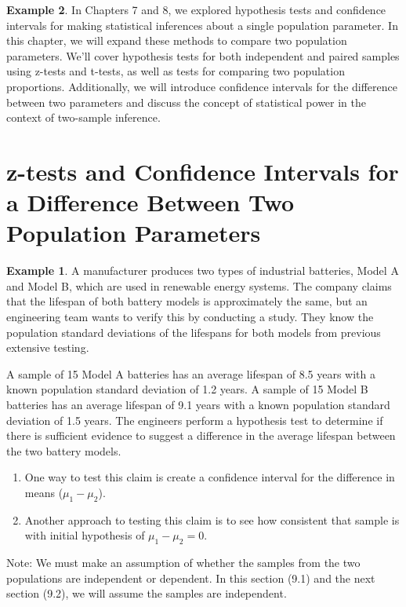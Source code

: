\documentclass[
  11pt,
  oneside]{book}
\providecommand{\tightlist}{%
  \setlength{\itemsep}{0pt}\setlength{\parskip}{0pt}}
\theoremstyle{definition}
\theoremstyle{definition}
\newtheorem{example}{Example}[chapter]
\theoremstyle{definition}
\theoremstyle{definition}
\theoremstyle{remark}
\begin{document}
\begin{example}
In Chapters 7 and 8, we explored hypothesis tests and confidence intervals for making statistical inferences about a single population parameter. In this chapter, we will expand these methods to compare two population parameters. We'll cover hypothesis tests for both independent and paired samples using z-tests and t-tests, as well as tests for comparing two population proportions. Additionally, we will introduce confidence intervals for the difference between two parameters and discuss the concept of statistical power in the context of two-sample inference.

\section{z-tests and Confidence Intervals for a Difference Between Two Population Parameters}\label{z-tests-and-confidence-intervals-for-a-difference-between-two-population-parameters}

\begin{example}
A manufacturer produces two types of industrial batteries, Model A and Model B, which are used in renewable energy systems. The company claims that the lifespan of both battery models is approximately the same, but an engineering team wants to verify this by conducting a study. They know the population standard deviations of the lifespans for both models from previous extensive testing.

A sample of 15 Model A batteries has an average lifespan of 8.5 years with a known population standard deviation of 1.2 years. A sample of 15 Model B batteries has an average lifespan of 9.1 years with a known population standard deviation of 1.5 years. The engineers perform a hypothesis test to determine if there is sufficient evidence to suggest a difference in the average lifespan between the two battery models.
\end{example}

\begin{enumerate}
\def\labelenumi{(\alph{enumi})}
\tightlist
\item
  One way to test this claim is create a confidence interval for the difference in means (\(\mu_1 - \mu_2\)).
\item
  Another approach to testing this claim is to see how consistent that sample is with initial hypothesis of \(\mu_1-\mu_2=0\).
\end{enumerate}

Note: We must make an assumption of whether the samples from the two populations are independent or dependent. In this section (9.1) and the next section (9.2), we will assume the samples are independent.


\end{example}
\end{document}

